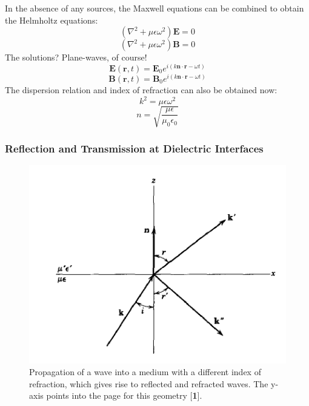 \documentclass{beamer}
\begin{document}
\begin{frame}



In the absence of any sources, the Maxwell equations can be combined to obtain the Helmholtz equations: 			
\begin{equation}\label{helm1}
	(\nabla^{2} + \mu \epsilon \omega^{2}) \mathbf{E} = 0
\end{equation}
\begin{equation}\label{helm2}
	(\nabla^{2} + \mu \epsilon \omega^{2}) \mathbf{B} = 0
\end{equation}
The solutions? Plane-waves, of course!
\begin{equation}
	\mathbf{E}(\mathbf{r}, t) = \mathbf{E}_{0} e^{i( k \mathbf{n} \cdot \mathbf{r} - \omega t )}
\end{equation}
\begin{equation}
	\mathbf{B}(\mathbf{r}, t) = \mathbf{B}_{0} e^{i( k \mathbf{n} \cdot \mathbf{r} - \omega t )}
\end{equation}
The dispersion relation and index of refraction can also be obtained now:
\begin{equation}
	k^{2} = \mu \epsilon \omega^{2}
\end{equation}
\begin{equation}\label{index}
	n = \sqrt{ \frac{ \mu \epsilon }{ \mu_{0} \epsilon_{0} } }
\end{equation}



\end{frame}






\begin{frame}
	
	
	
\frametitle{Reflection and Transmission at Dielectric Interfaces}



\begin{figure}[h]
	\centering
	\includegraphics[width=.65\linewidth]{1}
	\caption{Propagation of a wave into a medium with a different index of refraction, which gives rise to reflected and refracted waves. The y-axis points into the page for this geometry [\textbf{1}].}
	\label{fig:lat}
\end{figure}	



\end{frame}
\end{document}
